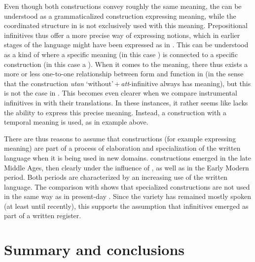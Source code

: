\documentclass[output=paper]{langscibook}
\begin{document}
Even though both constructions convey roughly the same meaning, the   can be understood as a grammaticalized construction expressing  meaning, while the coordinated structure in  is not exclusively used with this meaning. Prepositional infinitives thus offer a more precise way of expressing  notions, which in earlier stages of the language might have been expressed as in . This can be understood as a kind of  where a specific meaning (in this case ) is connected to a specific construction (in this case a ). When it comes to the  meaning, there thus exists a more or less one-to-one relationship between form and function in  (in the sense that the construction \textit{utan} ‘without’\,+\,\textit{att}-infinitive always has  meaning), but this is not the case in . This becomes even clearer when we compare instrumental infinitives in  with their  translations. In these instances, it rather seems like  lacks the ability to express this precise meaning. Instead, a construction with a temporal meaning is used, as in example  above. 



There are thus reasons to assume that  constructions (for example expressing  meaning) are part of a process of elaboration and specialization of the written language when it is being used in new domains.  constructions emerged in the late Middle Ages, then clearly under the influence of , as well as in the Early Modern period. Both periods are characterized by an increasing use of the written language. The comparison with  shows that specialized  constructions are not used in the same way as in present-day . Since the variety has remained mostly spoken (at least until recently), this supports the assumption that  infinitives emerged as part of a written register.  


\section{Summary and conclusions}\label{sec:kalm:6}
\end{document}
